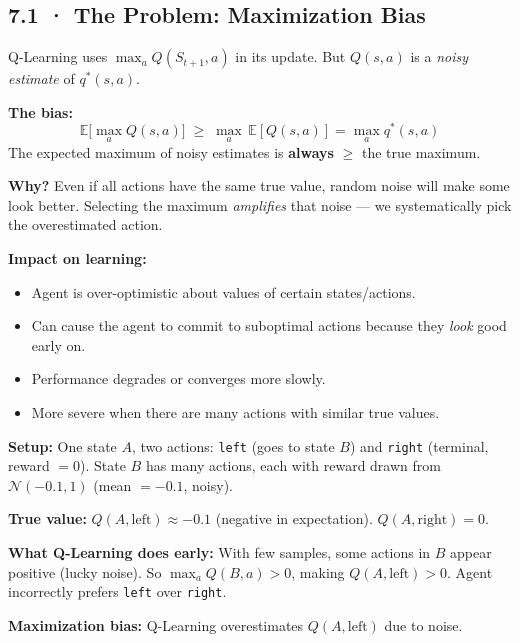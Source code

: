 \documentclass[11pt,a4paper]{article}
\begin{document}
\subsection*{7.1 · The Problem: Maximization Bias}

\begin{tcolorbox}[defn={What is Maximization Bias?}]
Q-Learning uses $\max_a Q(S_{t+1}, a)$ in its update. But $Q(s,a)$ is a \emph{noisy estimate}
of $q^*(s,a)$.

\medskip
\textbf{The bias:}
\[
  \mathbb{E}\bigl[\max_a Q(s,a)\bigr] \;\geq\; \max_a\,\mathbb{E}[Q(s,a)] = \max_a q^*(s,a)
\]
The expected maximum of noisy estimates is \textbf{always} $\geq$ the true maximum.

\medskip
\textbf{Why?} Even if all actions have the same true value, random noise will make some look
better. Selecting the maximum \emph{amplifies} that noise — we systematically pick the
overestimated action.
\end{tcolorbox}

\textbf{Impact on learning:}
\begin{itemize}
  \item Agent is over-optimistic about values of certain states/actions.
  \item Can cause the agent to commit to suboptimal actions because they \emph{look} good early on.
  \item Performance degrades or converges more slowly.
  \item More severe when there are many actions with similar true values.
\end{itemize}

\begin{tcolorbox}[exam={Illustrative Example — Maximization Bias}]
\textbf{Setup:} One state $A$, two actions: \texttt{left} (goes to state $B$) and \texttt{right}
(terminal, reward $= 0$). State $B$ has many actions, each with reward drawn from
$\mathcal{N}(-0.1, 1)$ (mean $= -0.1$, noisy).

\medskip
\textbf{True value:} $Q(A, \text{left}) \approx -0.1$ (negative in expectation).
$Q(A, \text{right}) = 0$.

\textbf{What Q-Learning does early:} With few samples, some actions in $B$ appear positive
(lucky noise). So $\max_a Q(B, a) > 0$, making $Q(A, \text{left}) > 0$.
Agent incorrectly prefers \texttt{left} over \texttt{right}.

\textbf{Maximization bias:} Q-Learning overestimates $Q(A, \text{left})$ due to noise.
\end{tcolorbox}
\end{document}
